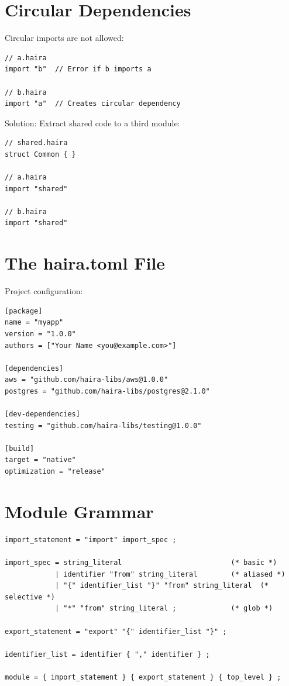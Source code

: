 \section{Circular Dependencies}

Circular imports are not allowed:

\begin{lstlisting}
// a.haira
import "b"  // Error if b imports a

// b.haira
import "a"  // Creates circular dependency
\end{lstlisting}

Solution: Extract shared code to a third module:

\begin{lstlisting}
// shared.haira
struct Common { }

// a.haira
import "shared"

// b.haira
import "shared"
\end{lstlisting}

\section{The haira.toml File}

Project configuration:

\begin{lstlisting}[language={}]
[package]
name = "myapp"
version = "1.0.0"
authors = ["Your Name <you@example.com>"]

[dependencies]
aws = "github.com/haira-libs/aws@1.0.0"
postgres = "github.com/haira-libs/postgres@2.1.0"

[dev-dependencies]
testing = "github.com/haira-libs/testing@1.0.0"

[build]
target = "native"
optimization = "release"
\end{lstlisting}

\section{Module Grammar}

\begin{lstlisting}[language=EBNF]
import_statement = "import" import_spec ;

import_spec = string_literal                          (* basic *)
            | identifier "from" string_literal        (* aliased *)
            | "{" identifier_list "}" "from" string_literal  (* selective *)
            | "*" "from" string_literal ;             (* glob *)

export_statement = "export" "{" identifier_list "}" ;

identifier_list = identifier { "," identifier } ;

module = { import_statement } { export_statement } { top_level } ;
\end{lstlisting}

